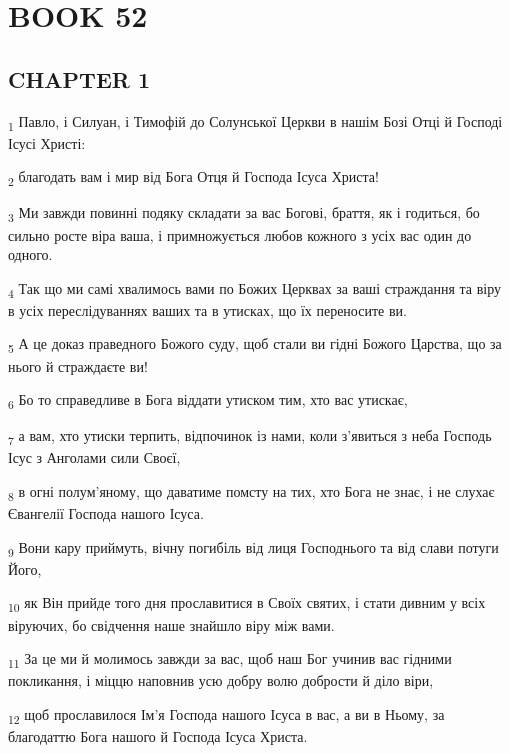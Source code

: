 \section{BOOK 52}
\subsection{CHAPTER 1}
\begin{tcolorbox}
\textsubscript{1} Павло, і Силуан, і Тимофій до Солунської Церкви в нашім Бозі Отці й Господі Ісусі Христі:
\end{tcolorbox}
\begin{tcolorbox}
\textsubscript{2} благодать вам і мир від Бога Отця й Господа Ісуса Христа!
\end{tcolorbox}
\begin{tcolorbox}
\textsubscript{3} Ми завжди повинні подяку складати за вас Богові, браття, як і годиться, бо сильно росте віра ваша, і примножується любов кожного з усіх вас один до одного.
\end{tcolorbox}
\begin{tcolorbox}
\textsubscript{4} Так що ми самі хвалимось вами по Божих Церквах за ваші страждання та віру в усіх переслідуваннях ваших та в утисках, що їх переносите ви.
\end{tcolorbox}
\begin{tcolorbox}
\textsubscript{5} А це доказ праведного Божого суду, щоб стали ви гідні Божого Царства, що за нього й страждаєте ви!
\end{tcolorbox}
\begin{tcolorbox}
\textsubscript{6} Бо то справедливе в Бога віддати утиском тим, хто вас утискає,
\end{tcolorbox}
\begin{tcolorbox}
\textsubscript{7} а вам, хто утиски терпить, відпочинок із нами, коли з'явиться з неба Господь Ісус з Анголами сили Своєї,
\end{tcolorbox}
\begin{tcolorbox}
\textsubscript{8} в огні полум'яному, що даватиме помсту на тих, хто Бога не знає, і не слухає Євангелії Господа нашого Ісуса.
\end{tcolorbox}
\begin{tcolorbox}
\textsubscript{9} Вони кару приймуть, вічну погибіль від лиця Господнього та від слави потуги Його,
\end{tcolorbox}
\begin{tcolorbox}
\textsubscript{10} як Він прийде того дня прославитися в Своїх святих, і стати дивним у всіх віруючих, бо свідчення наше знайшло віру між вами.
\end{tcolorbox}
\begin{tcolorbox}
\textsubscript{11} За це ми й молимось завжди за вас, щоб наш Бог учинив вас гідними покликання, і міццю наповнив усю добру волю добрости й діло віри,
\end{tcolorbox}
\begin{tcolorbox}
\textsubscript{12} щоб прославилося Ім'я Господа нашого Ісуса в вас, а ви в Ньому, за благодаттю Бога нашого й Господа Ісуса Христа.
\end{tcolorbox}
